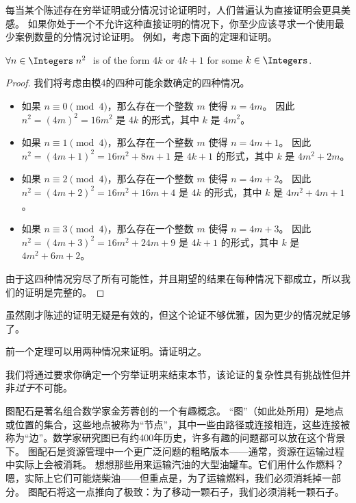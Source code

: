 每当某个陈述存在穷举证明或分情况讨论证明时，人们普遍认为直接证明会更具美感。
如果你处于一个不允许这种直接证明的情况下，你至少应该寻求一个使用最少案例数量的分情况讨论证明。
例如，考虑下面的定理和证明。

\begin{thm} $\forall n \in \Integers \; n^2 \;$ is of the form $4k$ or
      $4k+1$ for some $k \in \Integers$.
\end{thm}

\begin{proof}     
      我们将考虑由模4的四种可能余数确定的四种情况。
      \begin{itemize}          
            \item[情况 i)] 如果 $n \equiv 0 \pmod{4}$，那么存在一个整数 $m$ 使得 $n = 4m$。
                  因此 $n^2 = (4m)^2 = 16m^2$ 是 $4k$ 的形式，其中 $k$ 是 $4m^2$。    
            \item[情况 ii)] 如果 $n \equiv 1 \pmod{4}$，那么存在一个整数 $m$ 使得 $n = 4m+1$。
                  因此 $n^2 = (4m+1)^2 = 16m^2 + 8m + 1$ 是 $4k+1$ 的形式，其中 $k$ 是 $4m^2+2m$。          
            \item[情况 iii)] 如果 $n \equiv 2 \pmod{4}$，那么存在一个整数 $m$ 使得 $n = 4m+2$。
                  因此 $n^2 = (4m+2)^2 = 16m^2 + 16m + 4$ 是 $4k$ 的形式，其中 $k$ 是 $4m^2+4m+1$。
            \item[情况 iv)] 如果 $n \equiv 3 \pmod{4}$，那么存在一个整数 $m$ 使得 $n = 4m+3$。
                  因此 $n^2 = (4m+3)^2 = 16m^2 + 24m + 9$ 是 $4k+1$ 的形式，其中 $k$ 是 $4m^2+6m+2$。
      \end{itemize}
      由于这四种情况穷尽了所有可能性，并且期望的结果在每种情况下都成立，所以我们的证明是完整的。
\end{proof}

虽然刚才陈述的证明无疑是有效的，但这个论证不够优雅，因为更少的情况就足够了。

\begin{exer}    
      前一个定理可以用两种情况来证明。请证明之。
\end{exer}

我们将通过要求你确定一个穷举证明来结束本节，该论证的复杂性具有挑战性但并非\emph{过于}不可能。

图配石是著名组合数学家金芳蓉创的一个有趣概念。
“图”（如此处所用）是地点或位置的集合，这些地点被称为“节点”，其中一些由路径或连接相连，这些连接被称为“边”。数学家研究图已有约400年历史，许多有趣的问题都可以放在这个背景下。
图配石是资源管理中一个更广泛问题的粗略版本——通常，资源在运输过程中实际上会被消耗。
想想那些用来运输汽油的大型油罐车。它们用什么作燃料？
嗯，实际上它们可能烧柴油——但重点是，为了运输燃料，我们必须消耗掉一部分。
图配石将这一点推向了极致：为了移动一颗石子，我们必须消耗一颗石子。


